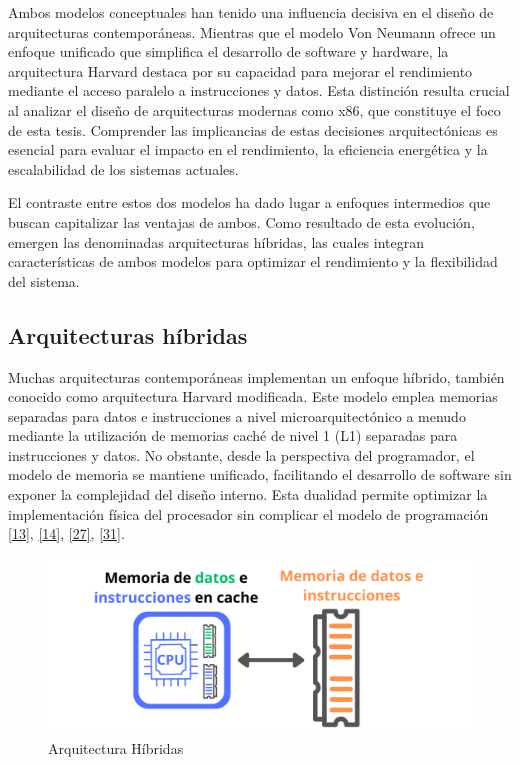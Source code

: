 \documentclass[12pt,oneside]{templates/unerthesis}
\begin{document}
Ambos modelos conceptuales han tenido una influencia decisiva en el diseño de arquitecturas contemporáneas. Mientras que el modelo Von Neumann ofrece un enfoque unificado que simplifica el desarrollo de software y hardware, la arquitectura Harvard destaca por su capacidad para mejorar el rendimiento mediante el acceso paralelo a instrucciones y datos. Esta distinción resulta crucial al analizar el diseño de arquitecturas modernas como x86, que constituye el foco de esta tesis. Comprender las implicancias de estas decisiones arquitectónicas es esencial para evaluar el impacto en el rendimiento, la eficiencia energética y la escalabilidad de los sistemas actuales.

El contraste entre estos dos modelos ha dado lugar a enfoques intermedios que buscan capitalizar las ventajas de ambos. Como resultado de esta evolución, emergen las denominadas arquitecturas híbridas, las cuales integran características de ambos modelos para optimizar el rendimiento y la flexibilidad del sistema.

\hypertarget{arquitecturas-huxedbridas}{%
\subsection{Arquitecturas híbridas}\label{arquitecturas-huxedbridas}}

Muchas arquitecturas contemporáneas implementan un enfoque híbrido, también conocido como arquitectura Harvard modificada. Este modelo emplea memorias separadas para datos e instrucciones a nivel microarquitectónico a menudo mediante la utilización de memorias caché de nivel 1 (L1) separadas para instrucciones y datos. No obstante, desde la perspectiva del programador, el modelo de memoria se mantiene unificado, facilitando el desarrollo de software sin exponer la complejidad del diseño interno. Esta dualidad permite optimizar la implementación física del procesador sin complicar el modelo de programación \protect\hyperlink{ref-hennessy2017computer}{{[}13{]}}, \protect\hyperlink{ref-stallings_computer_2021}{{[}14{]}}, \protect\hyperlink{ref-null_essentials_2014}{{[}27{]}}, \protect\hyperlink{ref-patterson_computer_2017}{{[}31{]}}.

\begin{figure}

{\centering \includegraphics[width=0.85\linewidth]{images/hibrida} 

}

\caption{Arquitectura Híbridas}\label{fig:hibrida}
\end{figure}
\end{document}
